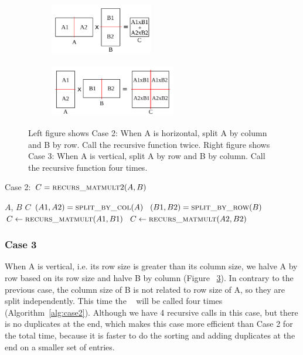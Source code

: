 \begin{figure}[tbh]
    \centering
    \begin{subfigure}{.45\textwidth}
        \centering
        \includegraphics[width=4.5cm,height=2.3cm]{./figures/case2_001.pdf}
        \label{fig:case2}
    \end{subfigure}
    \begin{subfigure}{.45\textwidth}
        \centering
        \includegraphics[width=5.5cm,height=2.3cm]{./figures/case3_001.pdf}
        \label{fig:case3}
    \end{subfigure}
    \caption{Left figure shows Case 2: When A is horizontal, split A by column and B by row. Call the recursive function twice. Right figure shows Case 3: When A is vertical, split A by row and B by column. Call the recursive function four times.}
\end{figure}

\begin{algorithm}[H] 
  \caption{Case 2: $C = \textsc{recurs\_matmult}2(A, B)$} \label{alg:case2} 
  \begin{algorithmic}[1]
    \Require $A$, $B$
    \Ensure  $C$
    \State $(A1, A2) = \textsc{split\_by\_col}(A)$
    \State $(B1, B2) = \textsc{split\_by\_row}(B)$
    \State $C \leftarrow \textsc{recurs\_matmult}(A1,B1)$
    \State $C \leftarrow \textsc{recurs\_matmult}(A2,B2)$
  \end{algorithmic}
\end{algorithm}

\subsubsection{Case 3}
\label{sec:case3}
When A is vertical, i.e. its row size is greater than its column size, we halve A by row based on its row size and halve B by column (Figure ~\ref{fig:case3}). In contrary to the previous case, the column size of B is not related to row size of A, so they are split independently. This time the \recmm~ will be called four times (Algorithm~\ref{alg:case2}).  Although we have 4 recursive calls in this case, but there is no duplicates at the end, which makes this case more efficient than Case 2 for the total time, because it is faster to do the sorting and adding duplicates at the end on a smaller set of entries. 

